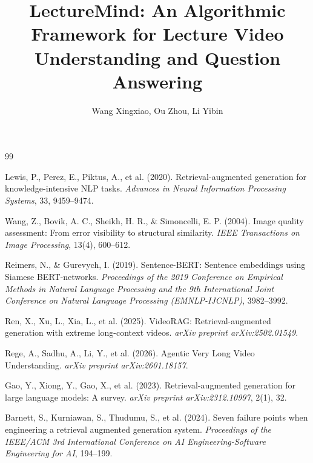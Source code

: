 \documentclass[10pt,a4paper]{article}
\title{LectureMind: An Algorithmic Framework for Lecture Video Understanding and Question Answering}
\author{Wang Xingxiao, Ou Zhou, Li Yibin}
\begin{document}
\maketitle









\newpage
\begin{thebibliography}{99}

Lewis, P., Perez, E., Piktus, A., et al. (2020). Retrieval-augmented generation for knowledge-intensive NLP tasks. \textit{Advances in Neural Information Processing Systems}, 33, 9459--9474.

Wang, Z., Bovik, A. C., Sheikh, H. R., \& Simoncelli, E. P. (2004). Image quality assessment: From error visibility to structural similarity. \textit{IEEE Transactions on Image Processing}, 13(4), 600--612.

Reimers, N., \& Gurevych, I. (2019). Sentence-BERT: Sentence embeddings using Siamese BERT-networks. \textit{Proceedings of the 2019 Conference on Empirical Methods in Natural Language Processing and the 9th International Joint Conference on Natural Language Processing (EMNLP-IJCNLP)}, 3982--3992.

Ren, X., Xu, L., Xia, L., et al. (2025). VideoRAG: Retrieval-augmented generation with extreme long-context videos. \textit{arXiv preprint arXiv:2502.01549}.

Rege, A., Sadhu, A., Li, Y., et al. (2026). Agentic Very Long Video Understanding. \textit{arXiv preprint arXiv:2601.18157}.

Gao, Y., Xiong, Y., Gao, X., et al. (2023). Retrieval-augmented generation for large language models: A survey. \textit{arXiv preprint arXiv:2312.10997}, 2(1), 32.

Barnett, S., Kurniawan, S., Thudumu, S., et al. (2024). Seven failure points when engineering a retrieval augmented generation system. \textit{Proceedings of the IEEE/ACM 3rd International Conference on AI Engineering-Software Engineering for AI}, 194--199.

\end{thebibliography}
\end{document}
